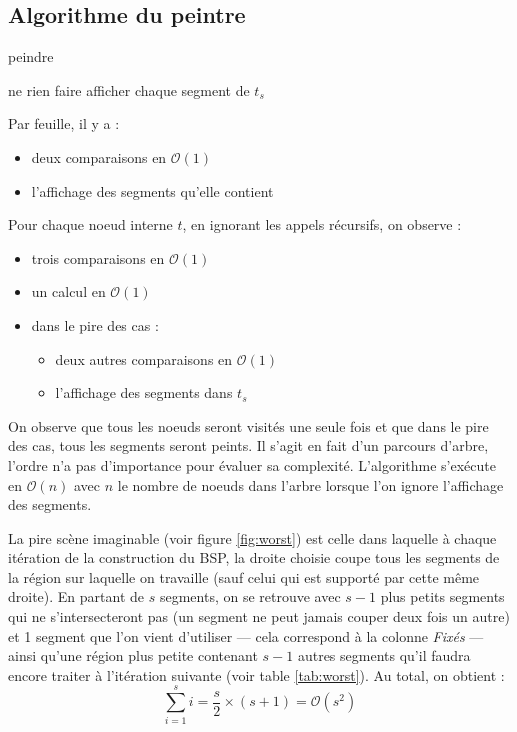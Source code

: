 \documentclass[12pt,twocolumn]{article}
\newcommand{\bigO}{\mathcal{O}}
\newcommand{\es}{\emptyset}
\begin{document}
\subsection{Algorithme du peintre}
\begin{algorithm}
\caption{peindre \cite[p.~255]{cg}}
\SetAlgoLined\DontPrintSemicolon
{}
\uIf{$t=\es$} {
	ne rien faire
}
\uElseIf{$(t^+=\es) \land (t^-=\es)$} {
	afficher chaque segment de $t_s$
}
~
\end{algorithm}

Par feuille, il y a :
\begin{itemize}
	\item deux comparaisons en $\bigO(1)$
	\item l'affichage des segments qu'elle contient
\end{itemize}

Pour chaque noeud interne $t$, en ignorant les appels récursifs, on observe :
\begin{itemize}
	\item trois comparaisons en $\bigO(1)$
	\item un calcul en $\bigO(1)$
	\item dans le pire des cas :
		\begin{itemize}
			\item deux autres comparaisons en $\bigO(1)$
			\item l'affichage des segments dans $t_s$
		\end{itemize}
\end{itemize}

On observe que tous les noeuds seront visités une seule fois et que dans le pire
des cas, tous les segments seront peints. Il s'agit en fait d'un parcours
d'arbre, l'ordre n'a pas d'importance pour évaluer sa complexité. L'algorithme
s'exécute en $\bigO(n)$ avec $n$ le nombre de noeuds dans l'arbre
lorsque l'on ignore l'affichage des segments.

La pire scène imaginable (voir figure \ref{fig:worst}) est celle
dans laquelle à chaque itération de la construction du BSP, la droite choisie
coupe tous les segments de la région sur laquelle on travaille (sauf celui qui
est supporté par cette même droite). En partant de $s$ segments,
on se retrouve avec
$s-1$ plus petits segments qui ne s'intersecteront pas (un segment ne peut
jamais couper deux fois un autre) et 1 segment que l'on vient d'utiliser
--- cela correspond à la colonne \textit{Fixés} ---
ainsi qu'une région plus petite contenant $s-1$ autres segments
qu'il faudra encore traiter à l'itération suivante (voir table \ref{tab:worst}).
Au total, on obtient :
\[
	\sum_{i=1}^{s}i = \frac s2\times (s+1) = \bigO(s^2)
\]
\end{document}
